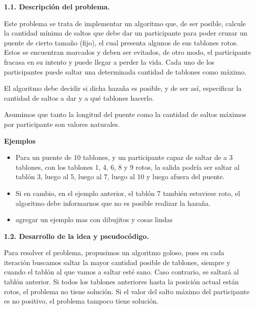 \noindent
\textbf{1.1. Descripción del problema.}

\vspace*{0.3cm}

Este problema se trata de implementar un algoritmo que, de ser posible, calcule la
cantidad mínima de saltos que debe dar un participante para poder cruzar un puente de cierto tamaño (fijo),
el cual presenta algunos de sus tablones rotos. Estos se encuentran marcados y deben ser evitados,
de otro modo, el participante fracasa en su intento y puede llegar a perder la vida. Cada uno
de los participantes puede saltar una determinada cantidad de tablones como máximo.

El algoritmo debe decidir si dicha hazaña es posible, y de ser así, especificar
la cantidad de saltos a dar y a qué tablones hacerlo.

Asumimos que tanto la longitud del puente como la cantidad de saltos máximos por participante
son valores naturales.

\textbf{Ejemplos}
\begin{itemize}
  \item Para un puente de 10 tablones, y un participante capaz de saltar de a 3
  tablones, con los tablones 1, 4, 6, 8 y 9 rotos, la salida podría ser saltar al
  tablón 3, luego al 5, luego al 7, luego al 10 y luego afuera del puente.
  \item Si en cambio, en el ejemplo anterior, el tablón 7 también estuviese roto,
  el algoritmo debe informarnos que no es posible realizar la hazaña.
  \item agregar un ejemplo mas con dibujitos y cosas lindas
\end{itemize}


\vspace*{0.75cm} \noindent



\noindent
\textbf{1.2. Desarrollo de la idea y pseudocódigo.}

\vspace*{0.3cm}

Para resolver el problema, propusimos un algoritmo goloso, pues en cada iteración
buscamos saltar la mayor cantidad posible de tablones, siempre y cuando el tablón
al que vamos a saltar esté sano. Caso contrario, se saltará al tablón anterior.
Si todos los tablones anteriores hasta la posición actual están rotos, el problema
no tiene solución. Si el valor del salto máximo del participante es no positivo,
el problema tampoco tiene solución.


